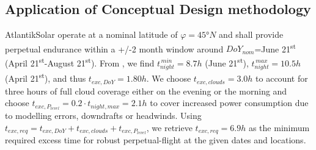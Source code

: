 \subsection{Application of Conceptual Design methodology} \label{sec:ConceptDesignApplication}
AtlantikSolar operate at a nominal latitude of $\varphi=45°N$ and shall provide perpetual endurance within a +/-2 month window around $DoY_{nom}$=June 21\textsuperscript{st} (April 21\textsuperscript{st}-August 21\textsuperscript{st}). From \cite{Duffie_SolarEngineering}, we find $t_{night}^{\,min}=8.7h$ (June 21\textsuperscript{st}), $t_{night}^{\,max}=10.5h$(April 21\textsuperscript{st}), and thus $t_{exc,DoY}=1.80h$. We choose $t_{exc,clouds}=3.0h$ to account for three hours of full cloud coverage either on the evening or the morning and choose $t_{exc,P_{level}}=0.2\cdot t_{night,max}=2.1h$ to cover increased power consumption due to modelling errors, downdrafts or headwinds. Using $t_{exc,req}=t_{exc,DoY}+t_{exc,clouds}+t_{exc,P_{level}}$, we retrieve $t_{exc,req}=6.9h$ as the minimum required excess time for robust perpetual-flight at the given dates and locations. 

